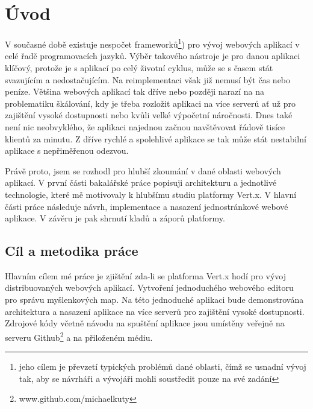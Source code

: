 

\chapter{Úvod}

V současné době existuje nespočet frameworků\footnote{jeho cílem je převzetí typických problémů dané oblasti, čímž se usnadní vývoj tak, aby se návrháři a vývojáři mohli soustředit pouze na své zadání}) pro vývoj webových aplikací v celé řadě programovacích jazyků. 
Výběr takového nástroje je pro danou aplikaci klíčový, protože je s aplikací po celý životní cyklus, může se s časem stát svazujícím a nedostačujícím. Na reimplementaci však již nemusí být čas nebo peníze. Většina webových aplikací tak dříve nebo později narazí na na problematiku škálování, kdy je třeba rozložit aplikaci na více serverů ať už pro zajištění vysoké dostupnosti nebo kvůli velké výpočetní náročnosti. Dnes také není nic neobvyklého, že aplikaci najednou začnou navštěvovat řádově tisíce klientů za minutu. Z dříve rychlé a spolehlivé aplikace se tak může stát nestabilní aplikace s nepřiměřenou odezvou.

Právě proto, jsem se rozhodl pro hlubší zkoumání v dané oblasti webových aplikací. V první části bakalářské práce popisuji architekturu a jednotlivé technologie, které mě motivovaly k hlubšímu studiu platformy Vert.x. V hlavní části práce následuje návrh, implementace a nasazení jednostránkové webové aplikace. V závěru je pak shrnutí kladů a záporů platformy.

\section{Cíl a metodika práce}

Hlavním cílem mé práce je zjištění zda-li se platforma Vert.x hodí pro vývoj distribuovaných webových aplikací. 
Vytvoření jednoduchého webového editoru pro správu myšlenkových map. %
Na této jednoduché aplikaci bude demonstrována architektura a nasazení aplikace na více serverů pro zajištění vysoké dostupnosti.
Zdrojové kódy včetně návodu na spuštění aplikace jsou umístěny veřejně na serveru Github\footnote{www.github.com/michaelkuty} a na přiloženém médiu.

